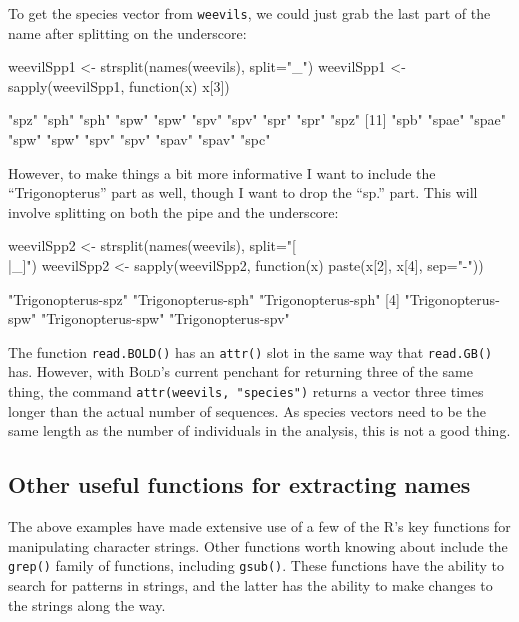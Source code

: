 \documentclass{article}
\newcommand{\progname}[1]{\textsc{#1}}
\newcommand{\fun}[1]{\texttt{#1}}
\begin{document}
To get the species vector from \fun{weevils}, we could just grab the last part of the name after splitting on the underscore:

\begin{console}
weevilSpp1 <- strsplit(names(weevils), split="_")
weevilSpp1 <- sapply(weevilSpp1, function(x) x[3])
\end{console}

\begin{Routput}
  [1] "spz"  "sph"  "sph"  "spw"  "spw"  "spv"  "spv"  "spr"  "spr"  "spz" 
 [11] "spb"  "spae" "spae" "spw"  "spw"  "spv"  "spv"  "spav" "spav" "spc"
\end{Routput}

However, to make things a bit more informative I want to include the ``Trigonopterus'' part as well, though I want to drop the ``sp.'' part. This will involve splitting on both the pipe and the underscore:

\begin{console}
weevilSpp2 <- strsplit(names(weevils), split="[\\|_]")
weevilSpp2 <- sapply(weevilSpp2, function(x) paste(x[2], x[4], sep="-"))
\end{console}

\begin{Routput}
  [1] "Trigonopterus-spz"  "Trigonopterus-sph"  "Trigonopterus-sph" 
  [4] "Trigonopterus-spw"  "Trigonopterus-spw"  "Trigonopterus-spv"
\end{Routput}

The function \fun{read.BOLD()} has an \fun{attr()} slot in the same way that \fun{read.GB()} has. However, with \progname{Bold}'s current penchant for returning three of the same thing, the command \fun{attr(weevils, "species")} returns a vector three times longer than the actual number of sequences. As species vectors need to be the same length as the number of individuals in the analysis, this is not a good thing.

\subsection{Other useful functions for extracting names}
The above examples have made extensive use of a few of the \progname{R}'s key functions for manipulating character strings. Other functions worth knowing about include the \fun{grep()} family of functions, including \fun{gsub()}. These functions have the ability to search for patterns in strings, and the latter has the ability to make changes to the strings along the way. 
\end{document}
